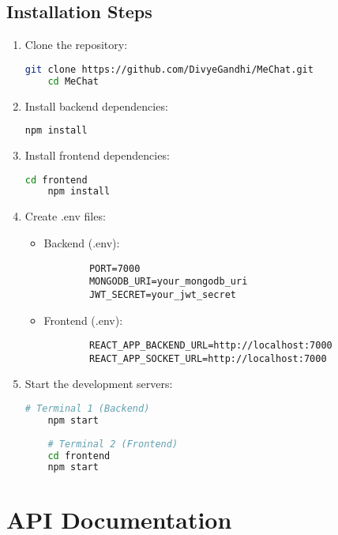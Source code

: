 \documentclass[12pt,a4paper]{article}
\begin{document}
\subsection{Installation Steps}
\begin{enumerate}
    \item Clone the repository:
    \begin{lstlisting}[language=bash]
    git clone https://github.com/DivyeGandhi/MeChat.git
    cd MeChat
    \end{lstlisting}
    
    \item Install backend dependencies:
    \begin{lstlisting}[language=bash]
    npm install
    \end{lstlisting}
    
    \item Install frontend dependencies:
    \begin{lstlisting}[language=bash]
    cd frontend
    npm install
    \end{lstlisting}
    
    \item Create .env files:
    \begin{itemize}
        \item Backend (.env):
        \begin{lstlisting}
        PORT=7000
        MONGODB_URI=your_mongodb_uri
        JWT_SECRET=your_jwt_secret
        \end{lstlisting}
        
        \item Frontend (.env):
        \begin{lstlisting}
        REACT_APP_BACKEND_URL=http://localhost:7000
        REACT_APP_SOCKET_URL=http://localhost:7000
        \end{lstlisting}
    \end{itemize}
    
    \item Start the development servers:
    \begin{lstlisting}[language=bash]
    # Terminal 1 (Backend)
    npm start
    
    # Terminal 2 (Frontend)
    cd frontend
    npm start
    \end{lstlisting}
\end{enumerate}

\section{API Documentation}
\end{document}
